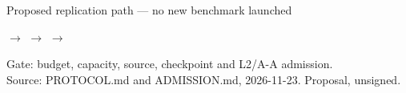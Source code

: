 \documentclass{article}
\begin{document}
\sffamily\small
Proposed replication path --- no new benchmark launched\par\medskip
{} $\rightarrow$
 $\rightarrow$
 $\rightarrow$
\par\medskip Gate: budget, capacity, source, checkpoint and L2/A-A admission.\\
Source: PROTOCOL.md and ADMISSION.md, 2026-11-23. Proposal, unsigned.
\end{document}
